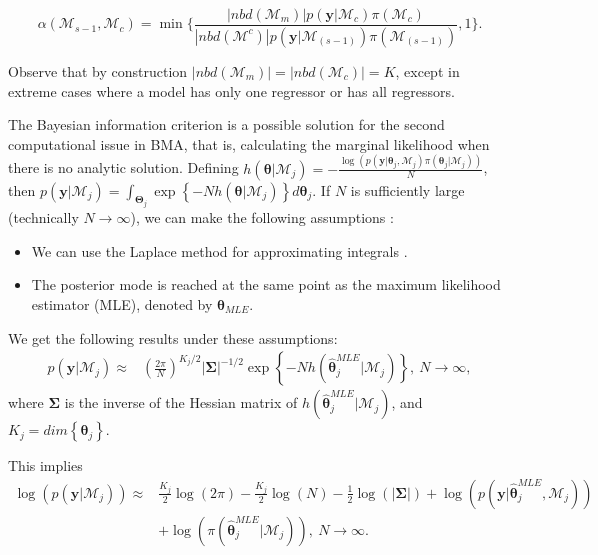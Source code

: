 \begin{equation*}
	\alpha (\mathcal{M}_{s-1},\mathcal{M}_{c})=\min \bigg \{ \frac{|nbd(\mathcal{M}_m)|p(\bm{y} | \mathcal{M}_c)\pi(\mathcal{M}_c)}{|nbd(\mathcal{M}^{c})|p(\bm{y}| \mathcal{M}_{(s-1)})\pi(\mathcal{M}_{(s-1)})},1 \bigg \}.
\end{equation*}

Observe that by construction $|nbd(\mathcal{M}_m)|=|nbd(\mathcal{M}_c)|=K$, except in extreme cases where a model has only one regressor or has all regressors.

The Bayesian information criterion is a possible solution for the second computational issue in BMA, that is, calculating the marginal likelihood when there is no analytic solution. Defining $h(\bm{\theta}|\mathcal{M}_j)=-\frac{\log(p(\bm{y}| \bm{\theta}_j,\mathcal{M}_j)\pi(\bm{\theta}_j | \mathcal{M}_j))}{N}$, then $p(\bm{y} | \mathcal{M}_j)=\int_{\bm{\Theta}_j} \exp\left\{-N h(\bm{\theta}|\mathcal{M}_j)\right\}  d\bm{\theta}_{j}$. If $N$ is sufficiently large (technically $N\to \infty$), we can make the following assumptions \cite{Hoeting1999}:

\begin{itemize}
	\item We can use the Laplace method for approximating integrals \cite{Tierney1986}.
	\item The posterior mode is reached at the same point as the maximum likelihood estimator (MLE), denoted by $\hat{\bm{\theta}}_{MLE}$.
\end{itemize}

We get the following results under these assumptions:
\begin{align*}
	p(\bm{y} | \mathcal{M}_j)\approx&\left( \frac{2\pi}{N}\right)^{K_j/2}|\bm{\Sigma}|^{-1/2} \exp\left\{-N h(\bm{\hat{\theta}}_j^{MLE}|\mathcal{M}_j)\right\}, \ N\rightarrow\infty,
\end{align*}
where $\bm{\Sigma}$ is the inverse of the Hessian matrix of $h(\bm{\hat{\theta}}_j^{MLE}|\mathcal{M}_j)$, and $K_j=dim\left\{\bm{\theta}_j\right\}$.

This implies
\begin{align*}
	\log\left(p(\bm{y} | \mathcal{M}_j)\right)\approx& \frac{K_j}{2}\log(2\pi)- \frac{K_j}{2}\log(N) -\frac{1}{2}\log(|\bm{\Sigma}|) + \log(p(\bm{y}| \bm{\hat{\theta}}_j^{MLE},\mathcal{M}_j))\\
	&+\log(\pi(\bm{\hat{\theta}}_j^{MLE} | \mathcal{M}_j)), \ N\rightarrow\infty.
\end{align*}

